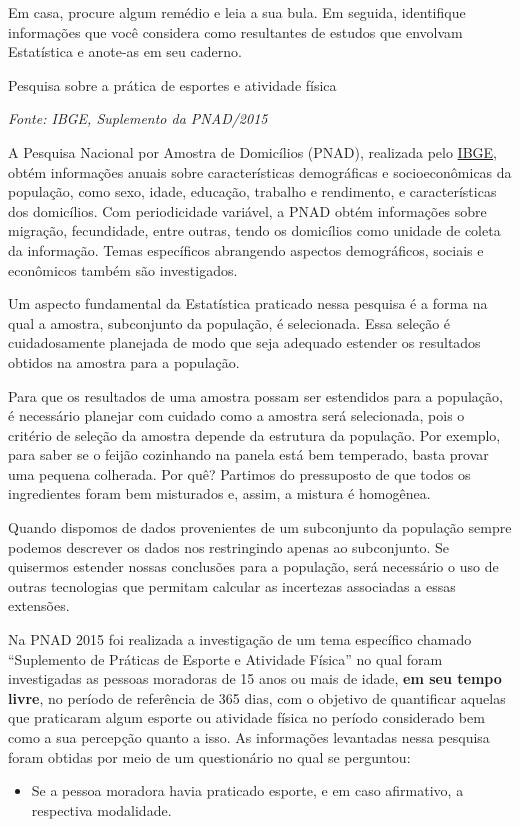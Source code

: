 \begin{research}

Em casa, procure algum remédio e leia a sua bula. Em seguida, identifique informações que você considera como resultantes de estudos que envolvam Estatística e anote-as em seu caderno.

\end{research}


\label{est1-ativ-3}
\begin{task}{ Pesquisa sobre a prática de esportes e atividade física}

\emph{Fonte: IBGE, Suplemento da PNAD/2015}

A Pesquisa Nacional por Amostra de Domicílios (PNAD), realizada pelo \href{https://www.ibge.gov.br/estatisticas-novoportal/sociais/populacao/9127-pesquisa-nacional-por-amostra-de-domicilios.html}{IBGE}, obtém informações anuais sobre características demográficas e socioeconômicas da população, como sexo, idade, educação, trabalho e rendimento, e características dos domicílios. Com periodicidade variável, a PNAD obtém informações sobre migração, fecundidade, entre outras, tendo os domicílios como unidade de coleta da informação. Temas específicos abrangendo aspectos demográficos, sociais e econômicos também são investigados.

Um aspecto fundamental da Estatística praticado nessa pesquisa é a forma na qual a amostra, subconjunto da população, é selecionada. Essa seleção é cuidadosamente planejada de modo que seja adequado estender os resultados obtidos na amostra para a população.

Para que os resultados de uma amostra possam ser estendidos para a população, é necessário planejar com cuidado como a amostra será selecionada, pois o critério de seleção da amostra depende da estrutura da população. Por exemplo, para saber se o feijão cozinhando na panela está bem temperado, basta provar uma pequena colherada. Por quê?  Partimos do pressuposto de que todos os ingredientes foram bem misturados e, assim, a mistura é homogênea.

Quando dispomos de dados provenientes de um subconjunto da população sempre podemos descrever os dados nos restringindo apenas ao subconjunto. Se quisermos estender nossas conclusões para a população, será necessário o uso de outras tecnologias que permitam calcular as incertezas associadas a essas extensões.

Na PNAD 2015 foi realizada a investigação de um tema específico chamado ``Suplemento de Práticas de Esporte e Atividade Física'' no qual foram investigadas as pessoas moradoras de 15 anos ou mais de idade, \textbf{em seu tempo livre}, no período de referência de 365 dias, com o objetivo de quantificar aquelas que praticaram algum esporte ou atividade física no período considerado bem como a sua percepção quanto a isso. As informações levantadas nessa pesquisa foram obtidas por meio de um questionário no qual se perguntou:
\begin{itemize}
\item {} 
Se a pessoa moradora havia praticado esporte, e em caso afirmativo, a respectiva modalidade.


\end{itemize}
\end{task}
